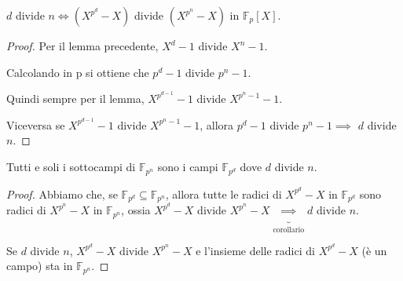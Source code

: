 \documentclass[10pt,a4paper,twoside]{book}
\begin{document}
\begin{corollary}
    $d$ divide $n \iff (X^{p^d} - X)$ divide $(X^{p^n} - X)$ in $\mathbb{F}_p[X]$.
\end{corollary}
\begin{proof}
    Per il lemma precedente, $X^d - 1$ divide $X^n - 1$.

    Calcolando in p si ottiene che $p^d - 1$ divide $p^n - 1$.

    Quindi sempre per il lemma, $X^{p^{d - 1}} - 1$ divide $X^{p^n - 1} - 1$.

    Viceversa se $X^{p^{d - 1}} - 1$ divide $X^{p^n -1 } - 1$, allora $p^d - 1$ divide $p^n - 1 \implies$ $d$ divide $n$.
\end{proof}

\begin{proposition}
    Tutti e soli i sottocampi di $\mathbb{F}_{p^n}$ sono i campi $\mathbb{F}_{p^d}$ dove $d$ divide $n$.
\end{proposition}

\begin{proof}
    Abbiamo che, se $\mathbb{F}_{p^d} \subseteq \mathbb{F}_{p^n}$, allora tutte le radici di $X^{p^d} - X$ in $\mathbb{F}_{p^d}$ sono radici di $X^{p^n} - X$ in $\mathbb{F}_{p^n}$, ossia $X^{p^d} - X$ divide $X^{p^n} - X \underbrace{\implies}_{\text{corollario}} d$ divide $n$.

    Se $d$ divide $n$, $X^{p^d} - X $ divide $X^{p^n} - X$ e l'insieme delle radici di $X^{p^d} - X$ (è un campo) sta in $\mathbb{F}_{p^n}$.
\end{proof}

\newpage
\end{document}
